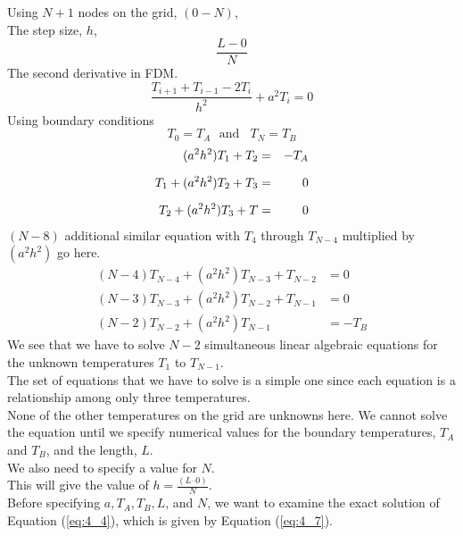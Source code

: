 \documentclass[12pt]{report}
\newcommand{\sps}{\\[0.2cm]}
\newcommand{\refn}[1]{(\ref{#1})}
\newcommand{\refx}[1]{\refn{eq:#1}}
\newcommand{\NI}{\noindent}
\newcommand{\dsp}{\displaystyle}
\begin{document}
	\NI Using $N+1$ nodes on the grid, $(0-N)$,\\
	
	\NI The step size, $h$,
	\begin{equation}
		\frac{L-0}{N}\label{eq:4_5}
	\end{equation}
	The second derivative in FDM.
	\begin{equation}
		\frac{T_{i+1} + T_{i-1} - 2T_i}{h^2} + a^2 T_i = 0\label{eq:4_6}
	\end{equation}
	Using boundary conditions
	\begin{equation*}
		T_0=T_A ~~~\text{and}~~~~ T_N = T_B
	\end{equation*}
	\begin{eqnarray}
		(a^2h^2)T_1 + T_2 &=& - T_A \notag \sps
		T_1 + (a^2h^2)T_2 + T_3 &=& 0\notag\sps
		T_2 + (a^2h^2)T_3 + T &=& 0\notag
	\end{eqnarray}
	$(N-8)$ additional similar equation with $T_4$ through $T_{N-4}$ multiplied by $(a^2h^2)$ go here.
	\begin{align*}
		(N-4)T_{N-4} + (a^2h^2)T_{N-3} + T_{N-2} &= 0 \\
		(N-3)T_{N-3} + (a^2h^2)T_{N-2} + T_{N-1} & = 0 \\
		(N-2)T_{N-2} + (a^2h^2)T_{N-1} &= -T_B
	\end{align*}
	We see that we have to solve $N-2$ simultaneous linear algebraic equations for the unknown temperatures $T_1$ to $T_{N-1}$.\\
	
	\NI The set of equations that we have to solve is a simple one since each equation is a relationship among only three temperatures.\\
	
	\NI None of the other temperatures on the grid are unknowns here. We cannot solve the equation until we specify numerical values for the boundary temperatures, $T_A$ and $T_B$, and the length, $L$.\\
	
	\NI We also need to specify a value for $N$.\\
	
	\NI This will give the value of $\dsp h = \frac{(L – 0)}{N}$.\\
	
	\NI Before specifying $a, T_A, T_B, L$, and $N$, we want to examine the exact solution of Equation \refx{4_4}, which is given by Equation \refx{4_7}.\\
	
\end{document}
